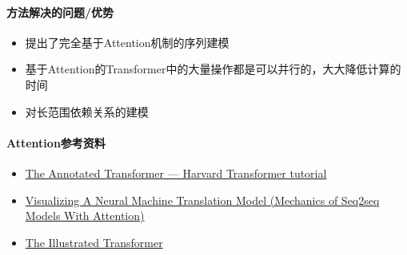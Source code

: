 \paragraph{方法解决的问题/优势}

\begin{itemize}

	\item 提出了完全基于Attention机制的序列建模
	\item 基于Attention的Transformer中的大量操作都是可以并行的，大大降低计算的时间
	\item 对长范围依赖关系的建模

\end{itemize}




\begin{itemize}


\end{itemize}



\paragraph{Attention参考资料}
\begin{itemize}
	\item \href{http://nlp.seas.harvard.edu/2018/04/03/attention.html}{The Annotated Transformer --- Harvard Transformer tutorial}
	\item \href{https://jalammar.github.io/visualizing-neural-machine-translation-mechanics-of-seq2seq-models-with-attention/}{Visualizing A Neural Machine Translation Model (Mechanics of Seq2seq Models With Attention)}
	\item \href{https://jalammar.github.io/illustrated-transformer/}{The Illustrated Transformer}
\end{itemize}



